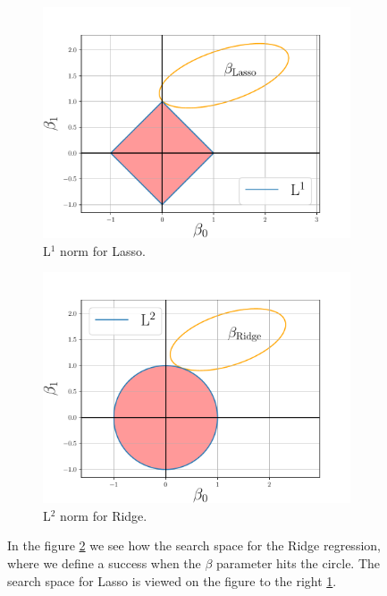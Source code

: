 \documentclass[11pt]{article}
\begin{document}
\begin{figure}
    \centering
    \begin{subfigure}[b]{0.5\textwidth}
        \centering
        \includegraphics[scale=0.5]{../fig/l1_norm.pdf}
        \caption{L$^1$ norm for Lasso.}
        \label{fig:l1_norm}
    \end{subfigure}%
    \begin{subfigure}[b]{0.5\textwidth}
        \centering
        \includegraphics[scale=0.5]{../fig/l2_norm.pdf}
        \caption{L$^2$ norm for Ridge.}
        \label{fig:l2_norm}
    \end{subfigure}
    \caption{In the figure \ref{fig:l2_norm} we see how the search space for the Ridge regression, where we define a success when the $\beta$ parameter hits the circle. The search space for Lasso is viewed on the figure to the right \ref{fig:l1_norm}.}
    \label{fig:norms}
\end{figure}
\end{document}
